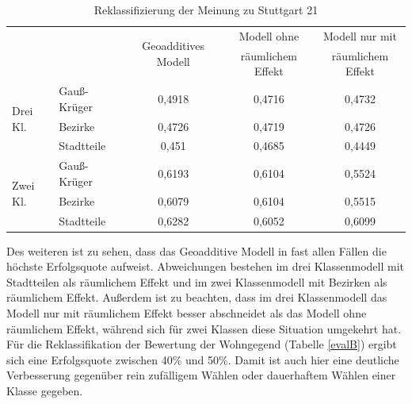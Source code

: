 \documentclass{Vorlage}
\begin{document}
\begin{table}[h]
\centering
\caption{Reklassifizierung der Meinung zu Stuttgart 21}
\label{evalS21}
\begin{tabular}{ll|c|c|c}
\hline \hline
                          &              & \multirow{2}{*}{Geoadditives Modell} & Modell ohne       & Modell nur mit    \\
                          &              &                                      & räumlichem Effekt & räumlichem Effekt \\ \hline
\multirow{3}{*}{Drei Kl.} & Gauß-Krüger & 0,4918                               & 0,4716            & 0,4732            \\
                          & Bezirke      & 0,4726                               & 0,4719            & 0,4726            \\
                          & Stadtteile   & 0,451                                & 0,4685            & 0,4449            \\ \hline
\multirow{3}{*}{Zwei Kl.} & Gauß-Krüger & 0,6193                               & 0,6104            & 0,5524            \\
                          & Bezirke      & 0,6079                               & 0,6104            & 0,5515            \\
                          & Stadtteile   & 0,6282                               & 0,6052            & 0,6099            \\ \hline \hline
\end{tabular}
\end{table}

Des weiteren ist zu sehen, dass das Geoadditive Modell in fast allen Fällen die höchste Erfolgsquote aufweist. Abweichungen bestehen im drei Klassenmodell mit Stadtteilen als räumlichem Effekt und im zwei Klassenmodell mit Bezirken als räumlichem Effekt. Außerdem ist zu beachten, dass im drei Klassenmodell das Modell nur mit räumlichem Effekt besser abschneidet als das Modell ohne räumlichem Effekt, während sich für zwei Klassen diese Situation umgekehrt hat.\\
Für die Reklassifikation der Bewertung der Wohngegend (Tabelle \ref{evalB}) ergibt sich eine Erfolgsquote zwischen 40\% und 50\%. Damit ist auch hier eine deutliche Verbesserung gegenüber rein zufälligem Wählen oder dauerhaftem Wählen einer Klasse gegeben. 
\end{document}
